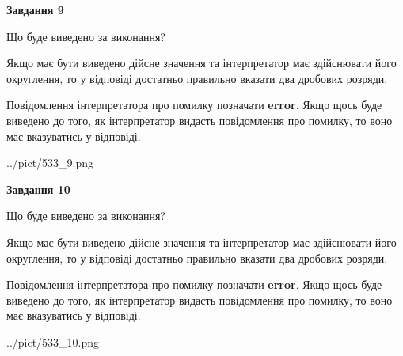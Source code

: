 \documentclass[12pt, ukrainian]{article}
\begin{document}
{\begin {Large}
{\begin {center}\textbf{Завдання 9}\end {center}}\par
Що буде виведено за виконання? \par

Якщо має бути виведено дійсне значення та інтерпретатор має здійснювати його округлення, 
то у відповіді достатньо правильно вказати два дробових розряди.

Повідомлення інтерпретатора про помилку позначати \textbf{error}.
Якщо щось буде виведено до того, як інтерпретатор видасть повідомлення про помилку, 
то воно має вказуватись у відповіді. \par

\begin{center}
	{../pict/533_9.png}
\end{center}
\newpage

{\begin {center}\textbf{Завдання 10}\end {center}}\par
Що буде виведено за виконання? \par

Якщо має бути виведено дійсне значення та інтерпретатор має здійснювати його округлення, 
то у відповіді достатньо правильно вказати два дробових розряди.

Повідомлення інтерпретатора про помилку позначати \textbf{error}.
Якщо щось буде виведено до того, як інтерпретатор видасть повідомлення про помилку, 
то воно має вказуватись у відповіді. \par

\begin{center}
	{../pict/533_10.png}
\end{center}
\newpage

\end {Large}}
\end{document}
